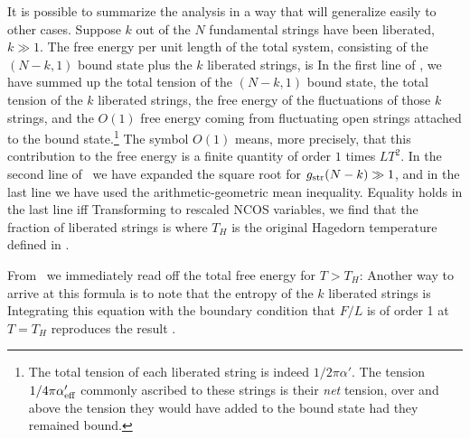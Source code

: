 It is possible to summarize the analysis in a way that will generalize
easily to other cases.  Suppose $k$ out of the $N$ fundamental strings
have been liberated, $k \gg 1$.  The free energy per unit length of
the total system, consisting of the $(N-k,1)$ bound state plus the $k$
liberated strings, is
 In the first line of \FkForm, we have summed up the total tension of
the $(N-k,1)$ bound state, the total tension of the $k$ liberated
strings, the free energy of the fluctuations of those $k$ strings, and
the $O(1)$ free energy coming from fluctuating open strings attached
to the bound state.\footnote{The total tension of each liberated
string is indeed $1/2\pi\alpha'$.  The tension $1/4\pi\alpha'_{\rm
eff}$ commonly ascribed to these strings is their {\it net} tension,
over and above the tension they would have added to the bound state
had they remained bound.}  The symbol $O(1)$ means, more precisely,
that this contribution to the free energy is a finite quantity of
order $1$ times $LT^2$.  In the second line of \FkForm\ we have
expanded the square root for $g_{\rm str} (N-k) \gg
1$, and in the last line we have used the arithmetic-geometric mean
inequality.  Equality holds in the last line iff
Transforming to rescaled NCOS variables, we find that
the fraction of liberated strings is
where $T_H$ is the original Hagedorn temperature
defined in \THAgain.

 From \FkForm\ we immediately read off the total free energy for
$T>T_H$:
Another way to arrive at this formula is to note that
the entropy of the $k$ liberated strings is
Integrating this equation with the boundary condition that
$F/L$ is of order 1 at $T=T_H$ reproduces the result
\TotalF.

